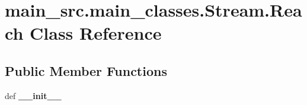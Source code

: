 \hypertarget{classmain__src_1_1main__classes_1_1Stream_1_1Reach}{\section{main\-\_\-src.\-main\-\_\-classes.\-Stream.\-Reach Class Reference}
\label{classmain__src_1_1main__classes_1_1Stream_1_1Reach}
}
\subsection*{Public Member Functions}
\begin{DoxyCompactItemize}
\item 
\hypertarget{classmain__src_1_1main__classes_1_1Stream_1_1Reach_a35aa55f89d7e61e47e6312a2ccf5e8fc}{def {\bfseries \-\_\-\-\_\-init\-\_\-\-\_\-}}\label{classmain__src_1_1main__classes_1_1Stream_1_1Reach_a35aa55f89d7e61e47e6312a2ccf5e8fc}

\end{DoxyCompactItemize}
